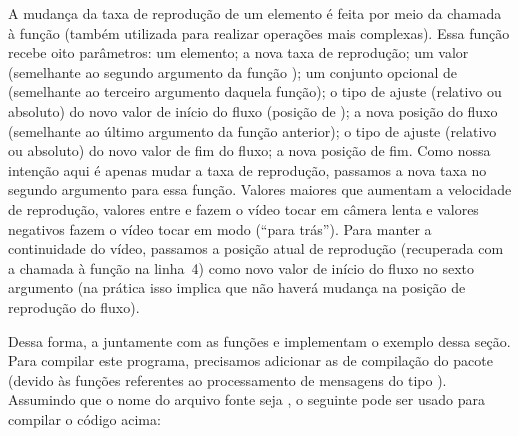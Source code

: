 A mudança da taxa de reprodução de um elemento é feita por meio da chamada à
função  (também utilizada para realizar operações 
 mais complexas). Essa função recebe oito parâmetros: um elemento;
a nova taxa de reprodução; um valor  (semelhante ao segundo
argumento da função ); um conjunto opcional de 
 (semelhante ao terceiro argumento daquela função); o tipo de
ajuste (relativo ou absoluto) do novo valor de início do fluxo (posição
de ); a nova posição do fluxo (semelhante ao último argumento da
função anterior); o tipo de ajuste (relativo ou absoluto) do novo valor de fim
do fluxo; a nova posição de fim. Como nossa intenção aqui é apenas mudar a taxa
de reprodução, passamos a nova taxa no segundo argumento para essa função. 
Valores maiores que  aumentam a velocidade de reprodução, valores entre
 e  fazem o vídeo tocar em câmera lenta e valores negativos fazem
o vídeo tocar em modo  (``para trás'').
Para manter a continuidade do vídeo, passamos a posição atual de reprodução
(recuperada com a chamada à função  na linha~4)
como novo valor de início do fluxo no sexto argumento (na prática isso implica
que não haverá mudança na posição de reprodução do fluxo). 

Dessa forma, a   juntamente com as funções 
e  implementam o exemplo dessa seção. Para compilar
este programa, precisamos adicionar as  de compilação do pacote
 (devido às funções referentes ao processamento de
mensagens do tipo ). Assumindo que o nome do arquivo fonte seja
, o seguinte  pode ser usado para
compilar o código acima:


